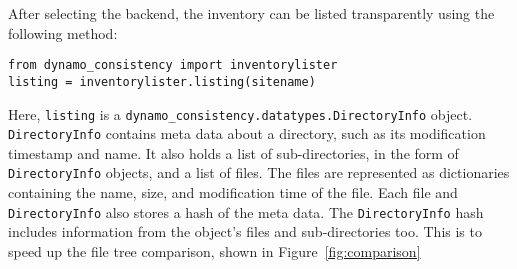 After selecting the backend,
the inventory can be listed transparently using the following method:

\begin{verbatim}
from dynamo_consistency import inventorylister
listing = inventorylister.listing(sitename)
\end{verbatim}

Here, \texttt{listing} is a \texttt{dynamo\_consistency.datatypes.DirectoryInfo} object. \\
\texttt{DirectoryInfo} contains meta data about a directory,
such as its modification timestamp and name.
It also holds a list of sub-directories, in the form of \texttt{DirectoryInfo} objects,
and a list of files.
The files are represented as dictionaries containing the name, size,
and modification time of the file.
Each file and \texttt{DirectoryInfo} also stores a hash of the meta data.
The \texttt{DirectoryInfo} hash includes information from the object’s
files and sub-directories too.
This is to speed up the file tree comparison, shown in Figure~\ref{fig:comparison}

